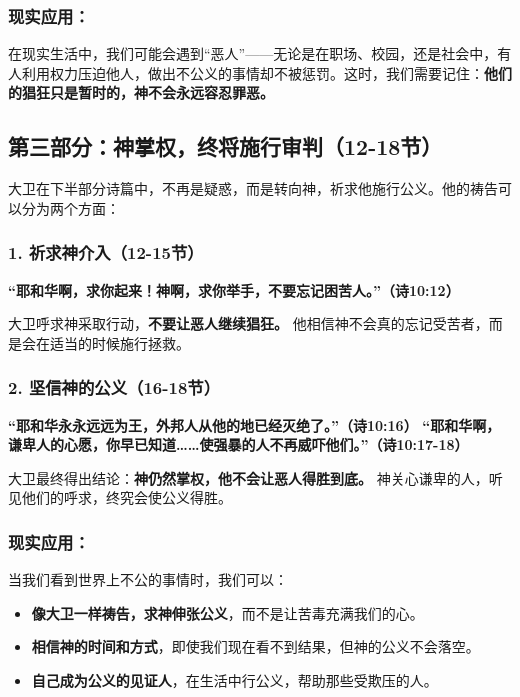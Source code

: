 \documentclass[a4paper, 12pt]{article}
\begin{document}
\subsubsection*{现实应用：}
在现实生活中，我们可能会遇到“恶人”——无论是在职场、校园，还是社会中，有人利用权力压迫他人，做出不公义的事情却不被惩罚。这时，我们需要记住：\textbf{他们的猖狂只是暂时的，神不会永远容忍罪恶。}  


\subsection*{第三部分：神掌权，终将施行审判（12-18节）}

大卫在下半部分诗篇中，不再是疑惑，而是转向神，祈求他施行公义。他的祷告可以分为两个方面：  

\subsubsection*{1. 祈求神介入（12-15节）}
\textbf{“耶和华啊，求你起来！神啊，求你举手，不要忘记困苦人。”（诗10:12） } 

\vspace{0.2cm}

大卫呼求神采取行动，\textbf{不要让恶人继续猖狂。} 他相信神不会真的忘记受苦者，而是会在适当的时候施行拯救。  

\subsubsection*{2. 坚信神的公义（16-18节）}
\textbf{“耶和华永永远远为王，外邦人从他的地已经灭绝了。”（诗10:16） } 
\textbf{“耶和华啊，谦卑人的心愿，你早已知道……使强暴的人不再威吓他们。”（诗10:17-18）  }

\vspace{0.2cm}

大卫最终得出结论：\textbf{神仍然掌权，他不会让恶人得胜到底。} 神关心谦卑的人，听见他们的呼求，终究会使公义得胜。  


\subsubsection*{现实应用：}
当我们看到世界上不公的事情时，我们可以：  
\begin{itemize}
    \item \textbf{像大卫一样祷告，求神伸张公义}，而不是让苦毒充满我们的心。
    \item \textbf{相信神的时间和方式}，即使我们现在看不到结果，但神的公义不会落空。
    \item \textbf{自己成为公义的见证人}，在生活中行公义，帮助那些受欺压的人。 
\end{itemize}
\end{document}

